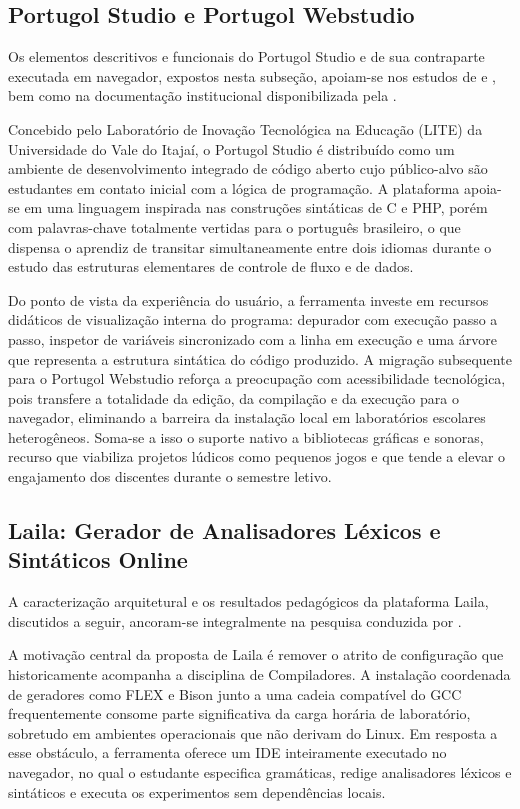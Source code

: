 \subsection{Portugol Studio e Portugol Webstudio}

Os elementos descritivos e funcionais do Portugol Studio e de sua contraparte executada em navegador, expostos nesta subseção, apoiam-se nos estudos de  e , bem como na documentação institucional disponibilizada pela .

Concebido pelo Laboratório de Inovação Tecnológica na Educação (LITE) da Universidade do Vale do Itajaí, o Portugol Studio é distribuído como um ambiente de desenvolvimento integrado de código aberto cujo público-alvo são estudantes em contato inicial com a lógica de programação. A plataforma apoia-se em uma linguagem inspirada nas construções sintáticas de C e PHP, porém com palavras-chave totalmente vertidas para o português brasileiro, o que dispensa o aprendiz de transitar simultaneamente entre dois idiomas durante o estudo das estruturas elementares de controle de fluxo e de dados.

Do ponto de vista da experiência do usuário, a ferramenta investe em recursos didáticos de visualização interna do programa: depurador com execução passo a passo, inspetor de variáveis sincronizado com a linha em execução e uma árvore que representa a estrutura sintática do código produzido. A migração subsequente para o Portugol Webstudio reforça a preocupação com acessibilidade tecnológica, pois transfere a totalidade da edição, da compilação e da execução para o navegador, eliminando a barreira da instalação local em laboratórios escolares heterogêneos. Soma-se a isso o suporte nativo a bibliotecas gráficas e sonoras, recurso que viabiliza projetos lúdicos como pequenos jogos e que tende a elevar o engajamento dos discentes durante o semestre letivo.

\subsection{Laila: Gerador de Analisadores Léxicos e Sintáticos Online}

A caracterização arquitetural e os resultados pedagógicos da plataforma Laila, discutidos a seguir, ancoram-se integralmente na pesquisa conduzida por .

A motivação central da proposta de Laila é remover o atrito de configuração que historicamente acompanha a disciplina de Compiladores. A instalação coordenada de geradores como FLEX e Bison junto a uma cadeia compatível do GCC frequentemente consome parte significativa da carga horária de laboratório, sobretudo em ambientes operacionais que não derivam do Linux. Em resposta a esse obstáculo, a ferramenta oferece um IDE inteiramente executado no navegador, no qual o estudante especifica gramáticas, redige analisadores léxicos e sintáticos e executa os experimentos sem dependências locais.


